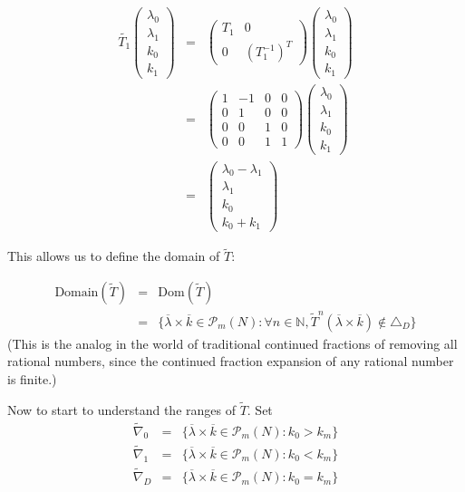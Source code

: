 \documentclass[12pt,oneside,openany]{article}
\def\N{{\mathbb N}} %
\begin{document}
 \begin{eqnarray*}\tilde{T_1} \left( \begin{array}{c} \lambda_0\\    \lambda_1   \\ k_0 \\ k_1 \end{array} \right) &=& \left( \begin{array}{cc} T_1& 0\\0 & (T_1^{-1})^{T} \end{array} \right)   \left( \begin{array}{c} \lambda_0\\    \lambda_1 \\ k_0 \\ k_1   \end{array} \right) \\ &=& \left( \begin{array}{cccc} 1& -1&0&0\\0 & 1&0&0 \\ 0&0&1&0\\ 0&0& 1&1 \end{array} \right)   \left( \begin{array}{c} \lambda_0\\\lambda_1 \\ k_0 \\ k_1\end{array} \right) \\&=&   \left( \begin{array}{c} \lambda_0-\lambda_1\\\lambda_1 \\ k_0 \\ k_0+k_1 \end{array} \right) 
 \end{eqnarray*}
 
 
 This allows us to define the domain of $\tilde{T}$:
 
 \begin{eqnarray*}
 \mbox{Domain}(\tilde{T}) &=&  \mbox{Dom}(\tilde{T}) \\
 &=& \{\overline{\lambda} \times \overline{k}\in \mathcal{P}_m(N): \forall n\in \N, \tilde{T}^n (\overline{\lambda} \times \overline{k})\not\in \triangle_D \}
 \end{eqnarray*}
 (This is the analog in the world of traditional continued fractions  of removing all rational numbers, since the continued fraction expansion of any rational number is finite.)

 
Now to start to understand the ranges of $\tilde{T}$.   Set
 \begin{eqnarray*}
    \tilde{\nabla}_0 &=& \{\overline{\lambda} \times \overline{k}\in \mathcal{P}_m(N) :  k_0 > k_m \} \\
     \tilde{\nabla}_1 &=& \{\overline{\lambda} \times \overline{k}\in \mathcal{P}_m(N) :  k_0 < k_m \} \\
 \tilde{\nabla}_D &=& \{\overline{\lambda} \times \overline{k}\in \mathcal{P}_m(N) :  k_0 =k_m \} \\
 \end{eqnarray*}
 
\end{document}
